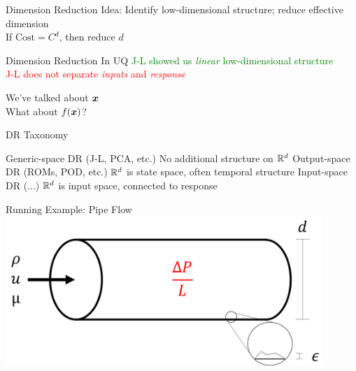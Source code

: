\documentclass[14pt]{beamer}
\begin{document}

\begin{frame}{Dimension Reduction}
  Idea: Identify low-dimensional structure; reduce effective dimension \\
  If $\text{Cost} = C^d$, then reduce $d$
\end{frame}

\begin{frame}{Dimension Reduction \alert{In UQ}}
  \bigskip \textcolor{green}{J-L showed us \emph{linear} low-dimensional structure} \\
  \textcolor{red}{J-L does not separate \emph{inputs} and \emph{response}}

  \bigskip We've talked about $\boldsymbol{x}$ \\
  What about $f(\boldsymbol{x})$?
\end{frame}

\begin{frame}{DR Taxonomy}
  \begin{outline}
  \1 Generic-space DR (J-L, PCA, etc.)
    \2 No additional structure on $\mathbb{R}^{d}$
  \1 Output-space DR (ROMs, POD, etc.)
    \2 $\mathbb{R}^{d}$ is state space, often temporal structure
  \1 \alert<2>{Input-space DR} (...)
    \2 $\mathbb{R}^{d}$ is input space, connected to response
  \end{outline}
\end{frame}

\begin{frame}{Running Example: Pipe Flow}
  \centering
  \includegraphics[width=0.9\textwidth]{../images/pipe_diagram}

\end{frame}
\end{document}
